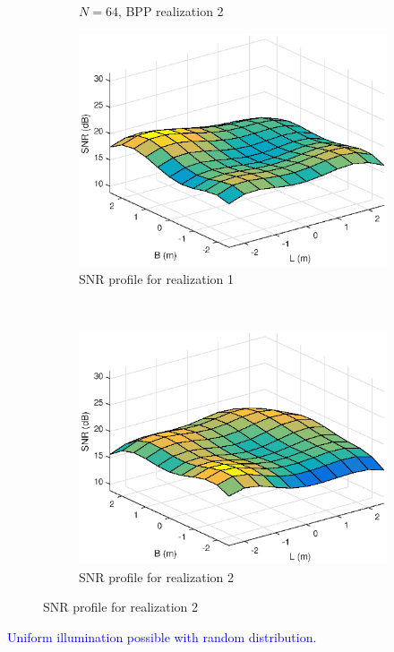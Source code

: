 \documentclass[slidestop,usepdftitle=false]{gvvslides}
\begin{document}
\begin{frame}
\begin{figure}[h!]
\begin{subfigure}[t]{0.5\columnwidth}
        \caption{$N=64$, BPP realization 2}
\label{fig:two_realize:led2}
    \end{subfigure}
        \begin{subfigure}[t]{0.5\columnwidth}
        \centering
        \includegraphics[scale=.2]{snrRealization1}
        \caption{SNR profile for realization 1}
\label{fig:two_realize:snr1}        
    \end{subfigure}%
    ~ 
    \begin{subfigure}[t]{0.5\columnwidth}
        \centering
        \includegraphics[scale=.2]{snrRealization2}
        \caption{SNR profile for realization 2}
\label{fig:two_realize:snr2}
    \end{subfigure}

    \label{fig:two_realize}
  \end{figure}  
  \begin{list}{}{}
 \item \textcolor{blue}{Uniform illumination possible with random distribution.}
  \end{list}
\end{frame}
\end{document}
